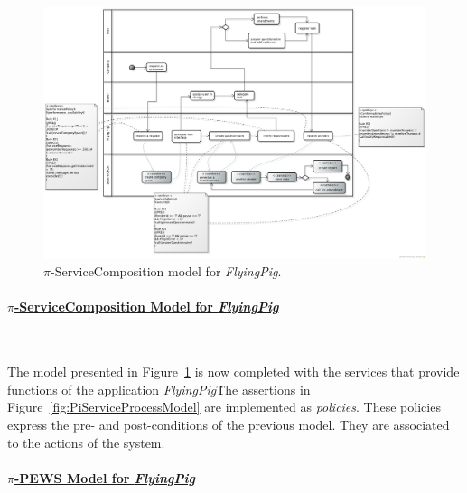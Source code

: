 \documentclass[12pt,twoside]{article}
\theoremstyle{plain}
\theoremstyle{plain}
\def\FlyingPig{\textsl{FlyingPig}\xspace}
\begin{document}
\begin{multicols}{2}
\begin{figure}
\centering
\includegraphics[width=1.0\textwidth]{ServiceCompositionGeneralCut}
\caption{$\pi$-ServiceComposition model for \FlyingPig.\label{fig:PiServiceCompositionModel}}
\end{figure}

\paragraph{\underline{$\pi$-ServiceComposition Model for \FlyingPig}}~

The model presented in Figure~\ref{fig:PiServiceCompositionModel}
is now  completed with the services that provide functions of the application  \FlyingPig\.
The assertions in Figure~\ref{fig:PiServiceProcessModel} are implemented as \textit{policies}.
These policies express the pre- and post-conditions of the previous model.
They are associated to the actions of the system.




\paragraph{\underline{$\pi$-PEWS Model for \FlyingPig}}~


\end{multicols}
\end{document}
